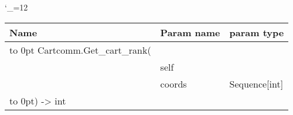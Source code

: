 \begingroup \catcode`\_=12 \tt
\begin{tabular}{lll}
\toprule
\textrm{Name}&\textrm{Param name}&\textrm{param type}\\
\midrule
\hbox to 0pt {Cartcomm.Get_cart_rank(\hss}\\
& self\\
& coords & Sequence[int]\\
\hbox to 0pt{) -> int\hss}\\
\bottomrule
\end{tabular}
\endgroup
